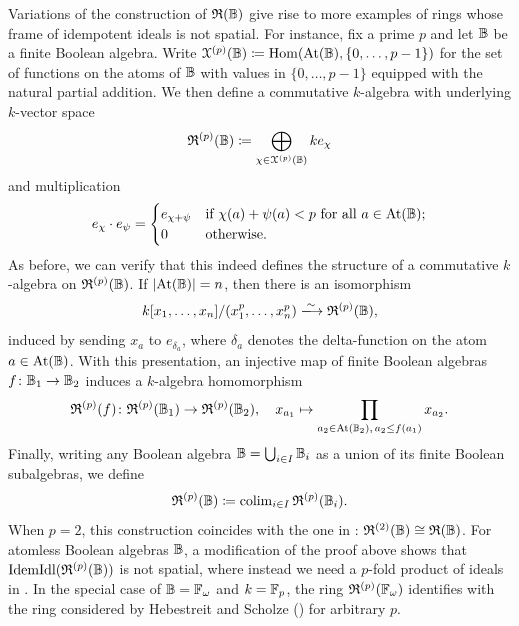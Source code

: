 \documentclass{amsart}
\begin{document}
    \begin{Rem}\label{rem:pBoolean}
        Variations of the construction of $\mathfrak{R}(\mathbb{B})$ give rise to more examples of rings whose frame of idempotent ideals is not spatial. For instance, fix a prime $p$ and let $\mathbb{B}$ be a finite Boolean algebra. Write $\mathcal{X}^{(p)}(\mathbb{B}) \coloneqq \operatorname{Hom}(\operatorname{At}(\mathbb{B}),\{0,\ldots, p-1\})$ for the set of functions on the atoms of $\mathbb{B}$ with values in $\{0,\ldots, p-1\}$ equipped with the natural partial addition. We then define a commutative $k$-algebra with underlying $k$-vector space
            \[
                \mathfrak{R}^{(p)}(\mathbb{B}) \coloneqq \bigoplus_{\chi \in \mathcal{X}^{(p)}(\mathbb{B})}ke_{\chi}
            \]
        and multiplication
            \[
                e_{\chi}\cdot e_{\psi} = 
                \begin{cases}
                    e_{\chi + \psi} & \text{if } \chi(a) + \psi(a) < p \text{ for all } a \in \operatorname{At}(\mathbb{B}); \\
                    0 & \text{otherwise}.
                \end{cases}
            \]
        As before, we can verify that this indeed defines the structure of a commutative $k$-algebra on $\mathfrak{R}^{(p)}(\mathbb{B})$. If $\lvert \operatorname{At}(\mathbb{B})\rvert = n$, then there is an isomorphism 
            \[
                k[x_1,\ldots,x_n]/(x_1^p,\ldots,x_n^p) \xlongrightarrow{\sim} \mathfrak{R}^{(p)}(\ba{B}),
            \]
        induced by sending $x_a$ to $e_{\delta_a}$, where $\delta_a$ denotes the delta-function on the atom $a \in \operatorname{At}(\mathbb{B})$. With this presentation, an injective map of finite Boolean algebras $f\colon \mathbb{B}_1 \to \mathbb{B}_2$ induces a $k$-algebra homomorphism 
            \[
                \mathfrak{R}^{(p)}(f)\colon \mathfrak{R}^{(p)}(\mathbb{B}_1) \to \mathfrak{R}^{(p)}(\mathbb{B}_2), \quad x_{a_1} \mapsto \prod_{a_2 \in \operatorname{At}(\mathbb{B}_2),\, a_2 \leq f(a_1)} x_{a_2}.
            \]
        Finally, writing any Boolean algebra $\mathbb{B} = \bigcup_{i \in I}\mathbb{B}_i$ as a union of its finite Boolean subalgebras, we define
            \[
                \mathfrak{R}^{(p)}(\mathbb{B}) \coloneqq \operatorname{colim}_{i \in I} \mathfrak{R}^{(p)}(\mathbb{B}_i).
            \]
        When $p=2$, this construction coincides with the one in : $\mathfrak{R}^{(2)}(\mathbb{B}) \cong \mathfrak{R}(\mathbb{B})$. For atomless Boolean algebras $\mathbb{B}$, a modification of the proof above shows that $\mathrm{IdemIdl}(\mathfrak{R}^{(p)}(\mathbb{B}))$ is not spatial, where instead we need a $p$-fold product of ideals in . In the special case of $\mathbb{B} = \mathbb{F}_{\omega}$ and $k = \mathbb{F}_p$, the ring $\mathfrak{R}^{(p)}(\mathbb{F}_{\omega})$ identifies with the ring considered by Hebestreit and Scholze () for arbitrary $p$.
    \end{Rem}
\end{document}
